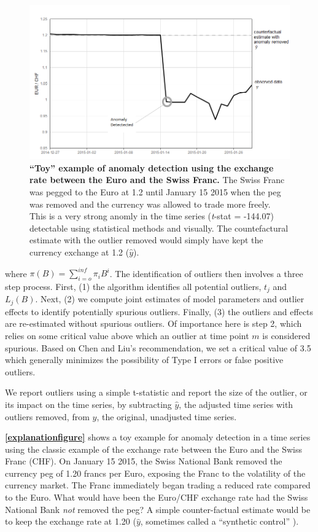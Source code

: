 \documentclass[12pt]{article}
\begin{document}
\begin{figure}
\centering
\includegraphics{./manuscript_files/figure-latex/Figure1.png}
\caption{\textbf{``Toy'' example of anomaly detection using the exchange
rate between the Euro and the Swiss Franc.} The Swiss Franc was pegged
to the Euro at 1.2 until January 15 2015 when the peg was removed and
the currency was allowed to trade more freely. This is a very strong
anomly in the time series (\emph{t}-stat = -144.07) detectable using
statistical methods and visually. The countefactural estimate with the
outlier removed would simply have kept the currency exchange at 1.2
(\(\hat{y}\)). \label{explanationfigure}}
\end{figure}

where \(\pi(B)=\sum_{i=o}^{inf} \pi_iB^i\). The identification of
outliers then involves a three step process. First, (1) the algorithm
identifies all potential outliers, \(t_j\) and \(L_j (B)\). Next, (2) we
compute joint estimates of model parameters and outlier effects to
identify potentially spurious outliers. Finally, (3) the outliers and
effects are re-estimated without spurious outliers. Of importance here
is step 2, which relies on some critical value above which an outlier at
time point \(m\) is considered spurious. Based on Chen and Liu's
\citeyearpar{chen1993joint} recommendation, we set a critical value of
3.5 which generally minimizes the possibility of Type I errors or false
positive outliers.

We report outliers using a simple t-statistic and report the size of the
outlier, or its impact on the time series, by subtracting \(\hat{y}\),
the adjusted time series with outliers removed, from \(y\), the
original, unadjusted time series.

\textbf{\autoref{explanationfigure}} shows a toy example for anomaly
detection in a time series using the classic example of the exchange
rate between the Euro and the Swiss Franc (CHF). On January 15 2015, the
Swiss National Bank removed the currency peg of 1.20 francs per Euro,
exposing the Franc to the volatility of the currency market. The Franc
immediately began trading a reduced rate compared to the Euro. What
would have been the Euro/CHF exchange rate had the Swiss National Bank
\emph{not} removed the peg? A simple counter-factual estimate would be
to keep the exchange rate at 1.20 (\(\hat{y}\), sometimes called a
``synthetic control'' \citep{abadie2010synthetic}).
\end{document}
